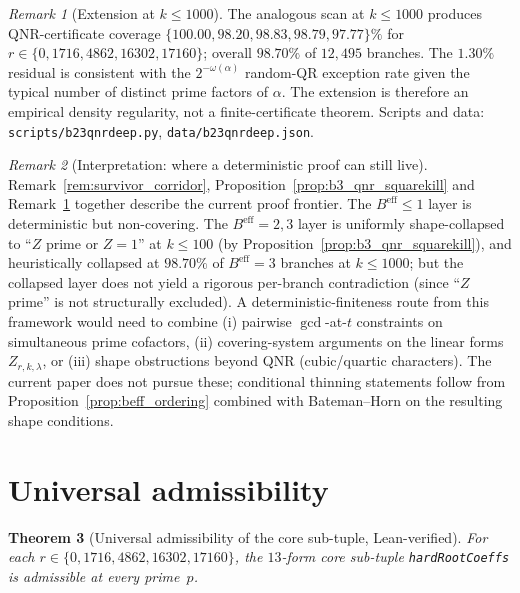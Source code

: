 \documentclass[11pt]{article}
\renewcommand{\_}{\origunderscore\allowbreak}
\newtheorem{theorem}{Theorem}[section]
\theoremstyle{definition}
\theoremstyle{remark}
\newtheorem{remark}[theorem]{Remark}
\begin{document}
\begin{remark}[Extension at $k\le 1000$]\label{rem:b3_qnr_k1000}
The analogous scan at $k\le 1000$ produces QNR-certificate coverage
$\{100.00, 98.20, 98.83, 98.79, 97.77\}\%$ for
$r\in\{0,1716,4862,16302,17160\}$; overall $98.70\%$ of $12{,}495$
branches.  The $1.30\%$ residual is consistent with the
$2^{-\omega(\alpha)}$ random-QR exception rate given the typical
number of distinct prime factors of $\alpha$.  The extension is
therefore an empirical density regularity, not a finite-certificate
theorem.  Scripts and data:
\texttt{scripts/b23\_qnr\_deep.py}, \texttt{data/b23\_qnr\_deep.json}.
\end{remark}

\begin{remark}[Interpretation: where a deterministic proof can still live]\label{rem:beff_frontier}
Remark~\ref{rem:survivor_corridor},
Proposition~\ref{prop:b3_qnr_squarekill} and
Remark~\ref{rem:b3_qnr_k1000} together describe the current proof
frontier.  The $B^{\mathrm{eff}}\le 1$ layer is deterministic but
non-covering.  The $B^{\mathrm{eff}}=2,3$ layer is uniformly
shape-collapsed to ``$Z$ prime or $Z=1$'' at $k\le 100$ (by
Proposition~\ref{prop:b3_qnr_squarekill}), and heuristically
collapsed at $98.70\%$ of $B^{\mathrm{eff}}=3$ branches at $k\le 1000$;
but the collapsed layer does not yield a rigorous per-branch
contradiction (since ``$Z$ prime'' is not structurally excluded).  A deterministic-finiteness route from this framework
would need to combine (i) pairwise $\gcd$-at-$t$ constraints on
simultaneous prime cofactors, (ii) covering-system arguments on the
linear forms $Z_{r,k,\lambda}$, or (iii) shape obstructions beyond
QNR (cubic/quartic characters).  The current paper does not pursue
these; conditional thinning statements follow from
Proposition~\ref{prop:beff_ordering} combined with Bateman--Horn on
the resulting shape conditions.
\end{remark}

\section{Universal admissibility}\label{sec:admissibility}

\begin{theorem}[Universal admissibility of the core sub-tuple, Lean-verified]
For each $r\in\{0,1716,4862,16302,17160\}$, the $13$-form core
sub-tuple \texttt{hardRootCoeffs} is admissible at every prime~$p$.
\end{theorem}
\end{document}
